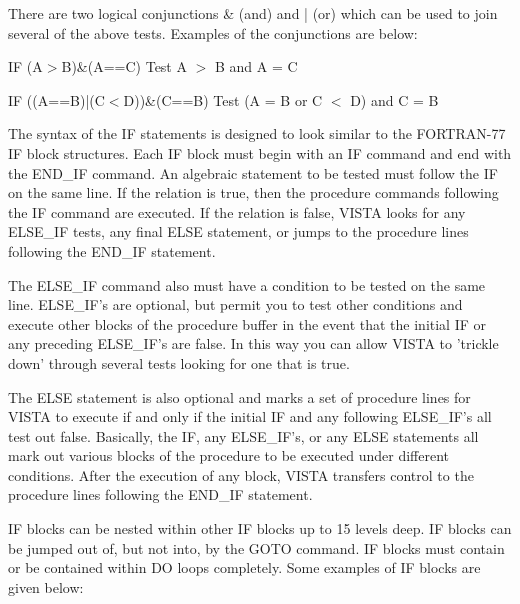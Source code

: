 There are two logical conjunctions \& (and) and | (or) which can be used to
join several of the above tests. Examples of the conjunctions are below:
\begin{example}
  \item[IF (A$>$B)\&(A==C)\hfill]{Test A $>$ B and A = C}
  \item[IF ((A==B)|(C$<$D))\&(C==B)\hfill]{Test (A = B or C $<$ D) and C = B}
\end{example}

The syntax of the IF statements is designed to look similar to the
FORTRAN-77 IF block structures.  Each IF block must begin with an IF
command and end with the END\_IF command.  An algebraic statement to be
tested must follow the IF on the same line.  If the relation is true, then
the procedure commands following the IF command are executed. If the
relation is false, VISTA looks for any ELSE\_IF tests, any final ELSE
statement, or jumps to the procedure lines following the END\_IF statement.

The ELSE\_IF command also must have a condition to be tested on the same
line.  ELSE\_IF's are optional, but permit you to test other conditions and
execute other blocks of the procedure buffer in the event that the initial
IF or any preceding ELSE\_IF's are false.  In this way you can allow VISTA
to 'trickle down' through several tests looking for one that is true.

The ELSE statement is also optional and marks a set of procedure lines for
VISTA to execute if and only if the initial IF and any following ELSE\_IF's
all test out false. Basically, the IF, any ELSE\_IF's, or any ELSE
statements all mark out various blocks of the procedure to be executed
under different conditions.  After the execution of any block, VISTA
transfers control to the procedure lines following the END\_IF statement.

IF blocks can be nested within other IF blocks up to 15 levels deep.  IF
blocks can be jumped out of, but not into, by the GOTO command. IF blocks
must contain or be contained within DO loops completely. Some examples of
IF blocks are given below:

